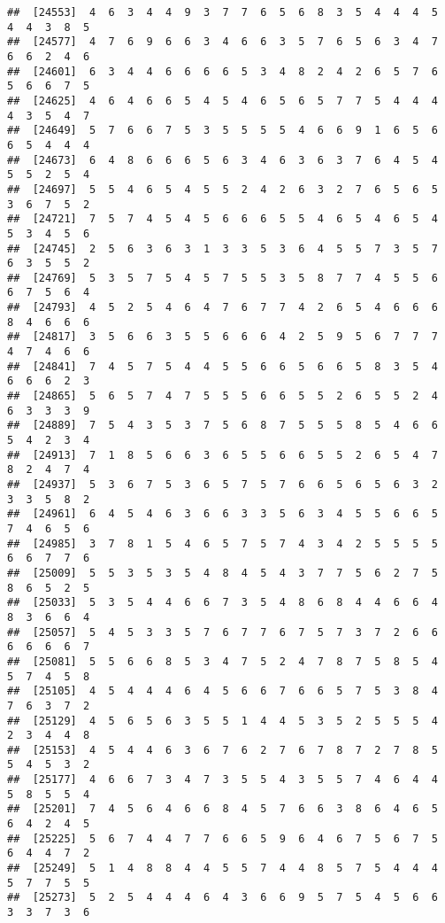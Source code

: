 \documentclass[
]{book}
\begin{document}
\begin{verbatim}
##  [24553]  4  6  3  4  4  9  3  7  7  6  5  6  8  3  5  4  4  4  5  4  4  3  8  5
##  [24577]  4  7  6  9  6  6  3  4  6  6  3  5  7  6  5  6  3  4  7  6  6  2  4  6
##  [24601]  6  3  4  4  6  6  6  6  5  3  4  8  2  4  2  6  5  7  6  5  6  6  7  5
##  [24625]  4  6  4  6  6  5  4  5  4  6  5  6  5  7  7  5  4  4  4  4  3  5  4  7
##  [24649]  5  7  6  6  7  5  3  5  5  5  5  4  6  6  9  1  6  5  6  6  5  4  4  4
##  [24673]  6  4  8  6  6  6  5  6  3  4  6  3  6  3  7  6  4  5  4  5  5  2  5  4
##  [24697]  5  5  4  6  5  4  5  5  2  4  2  6  3  2  7  6  5  6  5  3  6  7  5  2
##  [24721]  7  5  7  4  5  4  5  6  6  6  5  5  4  6  5  4  6  5  4  5  3  4  5  6
##  [24745]  2  5  6  3  6  3  1  3  3  5  3  6  4  5  5  7  3  5  7  6  3  5  5  2
##  [24769]  5  3  5  7  5  4  5  7  5  5  3  5  8  7  7  4  5  5  6  6  7  5  6  4
##  [24793]  4  5  2  5  4  6  4  7  6  7  7  4  2  6  5  4  6  6  6  8  4  6  6  6
##  [24817]  3  5  6  6  3  5  5  6  6  6  4  2  5  9  5  6  7  7  7  4  7  4  6  6
##  [24841]  7  4  5  7  5  4  4  5  5  6  6  5  6  6  5  8  3  5  4  6  6  6  2  3
##  [24865]  5  6  5  7  4  7  5  5  5  6  6  5  5  2  6  5  5  2  4  6  3  3  3  9
##  [24889]  7  5  4  3  5  3  7  5  6  8  7  5  5  5  8  5  4  6  6  5  4  2  3  4
##  [24913]  7  1  8  5  6  6  3  6  5  5  6  6  5  5  2  6  5  4  7  8  2  4  7  4
##  [24937]  5  3  6  7  5  3  6  5  7  5  7  6  6  5  6  5  6  3  2  3  3  5  8  2
##  [24961]  6  4  5  4  6  3  6  6  3  3  5  6  3  4  5  5  6  6  5  7  4  6  5  6
##  [24985]  3  7  8  1  5  4  6  5  7  5  7  4  3  4  2  5  5  5  5  6  6  7  7  6
##  [25009]  5  5  3  5  3  5  4  8  4  5  4  3  7  7  5  6  2  7  5  8  6  5  2  5
##  [25033]  5  3  5  4  4  6  6  7  3  5  4  8  6  8  4  4  6  6  4  8  3  6  6  4
##  [25057]  5  4  5  3  3  5  7  6  7  7  6  7  5  7  3  7  2  6  6  6  6  6  6  7
##  [25081]  5  5  6  6  8  5  3  4  7  5  2  4  7  8  7  5  8  5  4  5  7  4  5  8
##  [25105]  4  5  4  4  4  6  4  5  6  6  7  6  6  5  7  5  3  8  4  7  6  3  7  2
##  [25129]  4  5  6  5  6  3  5  5  1  4  4  5  3  5  2  5  5  5  4  2  3  4  4  8
##  [25153]  4  5  4  4  6  3  6  7  6  2  7  6  7  8  7  2  7  8  5  5  4  5  3  2
##  [25177]  4  6  6  7  3  4  7  3  5  5  4  3  5  5  7  4  6  4  4  5  8  5  5  4
##  [25201]  7  4  5  6  4  6  6  8  4  5  7  6  6  3  8  6  4  6  5  6  4  2  4  5
##  [25225]  5  6  7  4  4  7  7  6  6  5  9  6  4  6  7  5  6  7  5  6  4  4  7  2
##  [25249]  5  1  4  8  8  4  4  5  5  7  4  4  8  5  7  5  4  4  4  5  7  7  5  5
##  [25273]  5  2  5  4  4  4  6  4  3  6  6  9  5  7  5  4  5  6  6  3  3  7  3  6

\end{verbatim}
\end{document}
